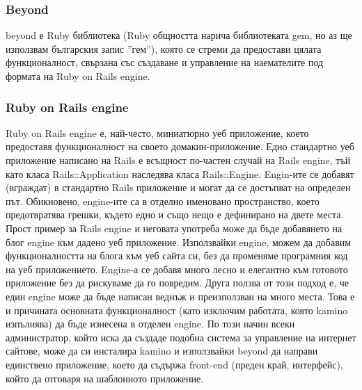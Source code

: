 \documentclass[pdftex,14pt,a4paper]{extreport}
\begin{document}
\subsubsection {Beyond}
beyond е Ruby библиотека (Ruby общността нарича библиотеката gem, но аз ще използвам българския запис ''гем''), която се стреми да предостави цялата функционалност, свързана със създаване и управление на наемателите под формата на Ruby on Rails engine.
\subsubsection {Ruby on Rails engine}
Ruby on Rails engine е, най-често, миниатюрно уеб приложение, което предоставя функционалност на своето домакин-приложение. Едно стандартно уеб приложение написано на Rails е всъщност по-частен случай на Rails engine, тъй като класа Rails::Application наследява класа Rails::Engine. Engin-ите се добавят (вграждат) в стандартно Rails приложение и могат да се достъпват на определен път. Обикновено, engine-ите са в отделно именовано пространство, което предотвратява грешки, където едно и също нещо е дефинирано на двете места. Прост пример за Rails engine и неговата употреба може да бъде добавянето на блог engine към дадено уеб приложение. Използвайки engine, можем да добавим функционалността на блога към уеб сайта си, без да променяме програмния код на уеб приложението. Engine-а се добавя много лесно и елегантно към готовото приложение без да рискуваме да го повредим. Друга ползва от този подход е, че един engine може да бъде написан веднъж и преизползван на много места. Това е и причината основната функционалност (като изключим работата, която kamino изпълнява) да бъде изнесена в отделен engine. По този начин всеки администратор, който иска да създаде подобна система за управление на интернет сайтове, може да си инсталира kamino и използвайки beyond да направи единствено приложение, което да съдържа front-end (преден край, интерфейс), който да отговаря на шаблонното приложение.
\end{document}

